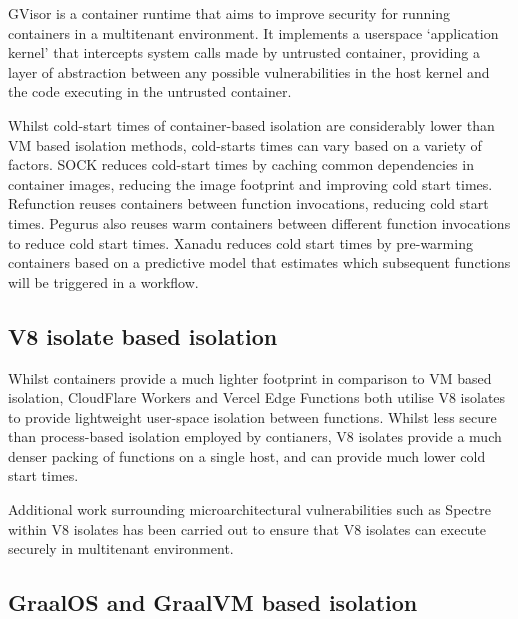 GVisor is a container runtime that aims to improve security for running containers in a multitenant environment\cite{GVisor}. It implements a userspace `application kernel' that intercepts system calls made by untrusted container, providing a layer of abstraction between any possible vulnerabilities in the host kernel and the code executing in the untrusted container.

Whilst cold-start times of container-based \faas{} isolation are considerably lower than VM based isolation methods, cold-starts times can vary based on a variety of factors. SOCK reduces cold-start times by caching common dependencies in container images, reducing the image footprint and improving cold start times\cite{oakesSOCKRapidTask2018}. Refunction reuses containers between function invocations, reducing cold start times\cite{oliverstenbomRefunctionEliminatingServerless2019}. Pegurus also reuses warm containers between different function invocations to reduce cold start times\cite{liPagurusEliminatingCold2021}. Xanadu reduces cold start times by pre-warming containers based on a predictive model that estimates which subsequent functions will be triggered in a \faas{} workflow\cite{dawXanaduMitigatingCascading2020}.

\subsection{V8 isolate based isolation}
Whilst containers provide a much lighter footprint in comparison to VM based isolation, CloudFlare Workers\cite{CloudComputingContainers2018} and Vercel Edge Functions\cite{EdgeRuntime} both utilise V8 isolates to provide lightweight user-space isolation between functions. Whilst less secure than process-based isolation employed by contianers, V8 isolates provide a much denser packing of functions on a single host, and can provide much lower cold start times.

Additional work surrounding microarchitectural vulnerabilities such as Spectre within V8 isolates has been carried out to ensure that V8 isolates can execute securely in multitenant environment\cite{schwarzlRobustScalableProcess2022}.

\subsection{GraalOS and GraalVM based isolation}

